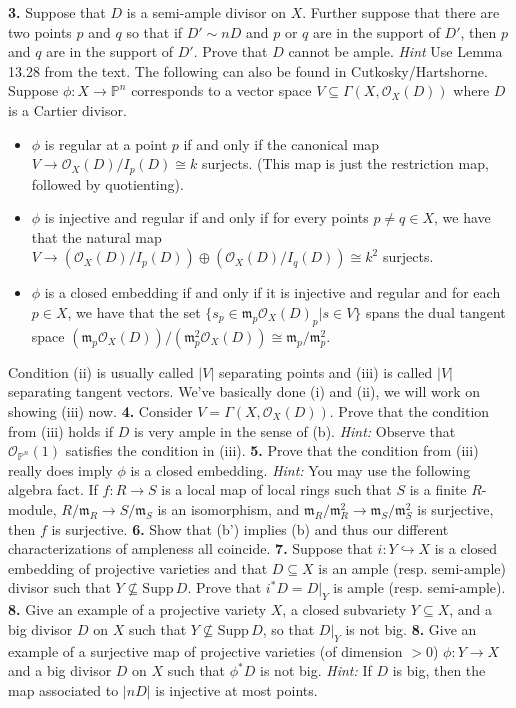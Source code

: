 \documentclass[11pt]{amsart}
\theoremstyle{theorem}
\renewcommand{\O}{\mathcal O}
\renewcommand{\to}[1][]{\xrightarrow{\ #1\ }}
\newcommand{\bP}{\mathbb{P}}
\newcommand{\Supp}{\mathrm{Supp}\,}
\newcommand{\fram}{\mathfrak{m}}
\begin{document}
{\bf 3.}  Suppose that $D$ is a semi-ample divisor on $X$.  Further suppose that there are two points $p$ and $q$ so that if $D' \sim nD$ and $p$ or $q$ are in the support of $D'$, then $p$ and $q$ are in the support of $D'$.  Prove that $D$ cannot be ample.  
\vskip 3pt
\emph{Hint} Use Lemma 13.28 from the text.
\newpage
The following can also be found in Cutkosky/Hartshorne.  Suppose $\phi : X \to \bP^n$ corresponds to a vector space $V \subseteq \Gamma(X, \O_X(D))$ where $D$ is a Cartier divisor.  
\begin{itemize}
\item[(i)]  $\phi$ is regular at a point $p$ if and only if the canonical map $V \to \O_X(D) / I_p(D) \cong k$ surjects.  (This map is just the restriction map, followed by quotienting).
\item[(ii)]  $\phi$ is injective and regular if and only if for every points $p \neq q \in X$, we have that the natural map $V \to (\O_X(D) / I_p(D)) \oplus (\O_X(D) / I_q(D)) \cong k^2$ surjects.  
\item[(iii)]  $\phi$ is a closed embedding if and only if it is injective and regular and for each $p \in X$, we have that the set $\{ s_p \in \fram_p \O_X(D)_p | s \in V \}$ spans the dual tangent space $(\fram_p \O_X(D)) / (\fram_p^2 \O_X(D)) \cong \fram_p/\fram_p^2$.
\end{itemize}
Condition (ii) is usually called $|V|$ separating points and (iii) is called $|V|$ separating tangent vectors.  We've basically done (i) and (ii), we will work on showing (iii) now.  
\vskip 9pt
\noindent
{\bf 4.}  Consider $V = \Gamma(X, \O_X(D))$.  Prove that the condition from (iii) holds if $D$ is very ample in the sense of (b). 
\vskip 3pt
\emph{Hint:} Observe that $\O_{\bP^n}(1)$ satisfies the condition in (iii).  
\vskip 170pt
\noindent
{\bf 5.}  Prove that the condition from (iii) really does imply $\phi$ is a closed embedding.  
\vskip 3pt
\emph{Hint:}  You may use the following algebra fact.  If $f : R \to S$ is a local map of local rings such that $S$ is a finite $R$-module, $R/\fram_R \to S/\fram_S$ is an isomorphism, and $\fram_R/\fram_R^2 \to \fram_S/\fram_S^2$ is surjective, then $f$ is surjective.  
\newpage
\noindent
{\bf 6.}  Show that (b') implies (b) and thus our different characterizations of ampleness all coincide.
\vskip 140pt
\noindent
{\bf 7.}  Suppose that $i : Y \hookrightarrow  X$ is a closed embedding of projective varieties and that $D \subseteq X$ is an ample (resp. semi-ample) divisor such that $Y \not\subseteq \Supp D$.  Prove that $i^* D = D|_Y$ is ample (resp. semi-ample).
\vskip 140pt
\noindent
{\bf 8.}  Give an example of a projective variety $X$, a closed subvariety $Y \subseteq X$, and a big divisor $D$ on $X$ such that $Y \not\subseteq \Supp D$, so that $D|_Y$ is not big. 
\vskip 140pt
\noindent
{\bf 8.}  Give an example of a surjective map of projective varieties (of dimension $> 0$) $\phi : Y \to X$ and a big divisor $D$ on $X$ such that $\phi^* D$ is not big.  
\vskip 3pt
\emph{Hint:} If $D$ is big, then the map associated to $|nD|$ is injective at most points.
\end{document}

